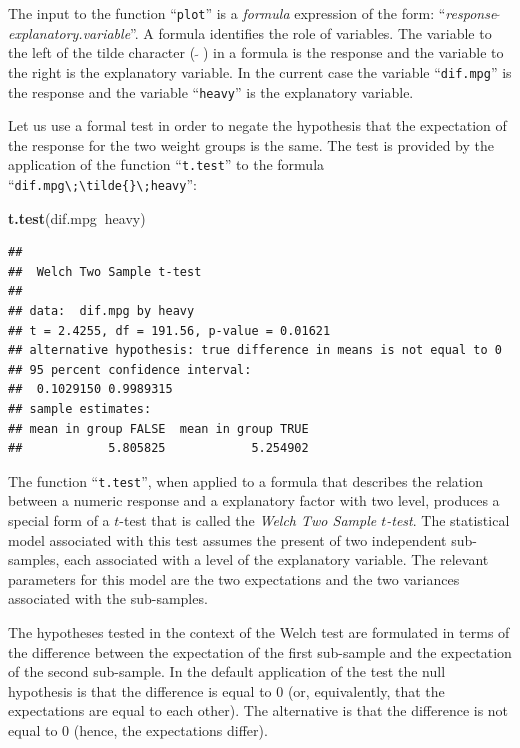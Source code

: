 \documentclass[
]{krantz}
\makeatletter
\newenvironment{Shaded}{\begin{snugshade}}{\end{snugshade}}
\newcommand{\KeywordTok}[1]{\textcolor[rgb]{0.13,0.29,0.53}{\textbf{#1}}}
\newcommand{\NormalTok}[1]{#1}
\newcommand{\OperatorTok}[1]{\textcolor[rgb]{0.81,0.36,0.00}{\textbf{#1}}}
\newenvironment{kframe}{%
\medskip{}
\setlength{\fboxsep}{.8em}
 \def\at@end@of@kframe{}%
 \ifinner\ifhmode%
  \def\at@end@of@kframe{\end{minipage}}%
  \begin{minipage}{\columnwidth}%
 \fi\fi%
 \def\FrameCommand##1{\hskip\@totalleftmargin \hskip-\fboxsep
 \colorbox{shadecolor}{##1}\hskip-\fboxsep
     \hskip-\linewidth \hskip-\@totalleftmargin \hskip\columnwidth}%
 \MakeFramed {\advance\hsize-\width
   \@totalleftmargin\z@ \linewidth\hsize
   \@setminipage}}%
 {\par\unskip\endMakeFramed%
 \at@end@of@kframe}
\renewenvironment{Shaded}{\begin{kframe}}{\end{kframe}}
\theoremstyle{definition}
\theoremstyle{definition}
\theoremstyle{definition}
\theoremstyle{remark}
\makeatother
\begin{document}
The input to the function ``\texttt{plot}'' is a \emph{formula} expression of the
form: ``\emph{response\(\;\tilde{}\;\)explanatory.variable}''. A formula
identifies the role of variables. The variable to the left of the tilde
character (\(\;\tilde{}\;\)) in a formula is the response and the variable
to the right is the explanatory variable. In the current case the
variable ``\texttt{dif.mpg}'' is the response and the variable ``\texttt{heavy}'' is the
explanatory variable.

Let us use a formal test in order to negate the hypothesis that the
expectation of the response for the two weight groups is the same. The
test is provided by the application of the function ``\texttt{t.test}'' to the
formula ``\texttt{dif.mpg\textbackslash{};\textbackslash{}tilde\{\}\textbackslash{};heavy}'':

\begin{Shaded}
\begin{Highlighting}[]
\KeywordTok{t.test}\NormalTok{(dif.mpg}\OperatorTok{~}\NormalTok{heavy)}
\end{Highlighting}
\end{Shaded}

\begin{verbatim}
## 
##  Welch Two Sample t-test
## 
## data:  dif.mpg by heavy
## t = 2.4255, df = 191.56, p-value = 0.01621
## alternative hypothesis: true difference in means is not equal to 0
## 95 percent confidence interval:
##  0.1029150 0.9989315
## sample estimates:
## mean in group FALSE  mean in group TRUE 
##            5.805825            5.254902
\end{verbatim}

The function ``\texttt{t.test}'', when applied to a formula that describes the
relation between a numeric response and a explanatory factor with two
level, produces a special form of a \(t\)-test that is called the \emph{Welch
Two Sample \(t\)-test}. The statistical model associated with this test
assumes the present of two independent sub-samples, each associated with
a level of the explanatory variable. The relevant parameters for this
model are the two expectations and the two variances associated with the
sub-samples.

The hypotheses tested in the context of the Welch test are formulated in
terms of the difference between the expectation of the first sub-sample
and the expectation of the second sub-sample. In the default application
of the test the null hypothesis is that the difference is equal to 0
(or, equivalently, that the expectations are equal to each other). The
alternative is that the difference is not equal to 0 (hence, the
expectations differ).
\end{document}
